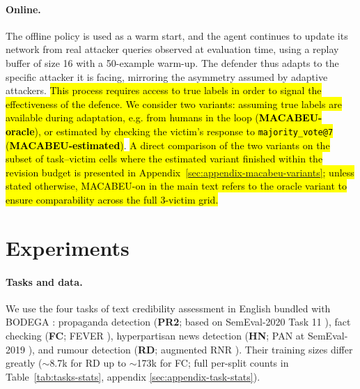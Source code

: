 \documentclass[11pt]{article}
\begin{document}
\paragraph{Online.} The offline policy is used as a warm start, and the agent continues to update its network from real attacker queries observed at evaluation time, using a replay buffer of size 16 with a 50-example warm-up. The defender thus adapts to the specific attacker it is facing, mirroring the asymmetry assumed by adaptive attackers. \hl{This process requires access to true labels in order to signal the effectiveness of the defence. We consider two variants: assuming true labels are available during adaptation, e.g. from humans in the loop (\textbf{MACABEU-oracle}), or estimated by checking the victim's response to \mbox{\texttt{majority\_vote@7}} (\textbf{MACABEU-estimated})}. \hl{A direct comparison of the two variants on the subset of task--victim cells where the estimated variant finished within the revision budget is presented in Appendix~\ref{sec:appendix-macabeu-variants}; unless stated otherwise, MACABEU-on in the main text refers to the oracle variant to ensure comparability across the full 3-victim grid.}

\section{Experiments}
\label{sec:experiments}
\paragraph{Tasks and data.}
We use the four tasks of text credibility assessment in English bundled with BODEGA \citep{verifying_robustness}: propaganda detection (\textbf{PR2}; based on SemEval-2020 Task 11 \citep{DaSanMartino2020semeval}), fact checking (\textbf{FC}; FEVER \citep{Thorne2018fever}), hyperpartisan news detection (\textbf{HN}; PAN at SemEval-2019 \citep{Kiesel2019hyperpartisan}), and rumour detection (\textbf{RD}; augmented RNR \citep{Zubiaga2016rumours}). Their training sizes differ greatly ($\sim$8.7k for RD up to $\sim$173k for FC; full per-split counts in Table~\ref{tab:tasks-stats}, appendix \ref{sec:appendix-task-stats}).
\end{document}
